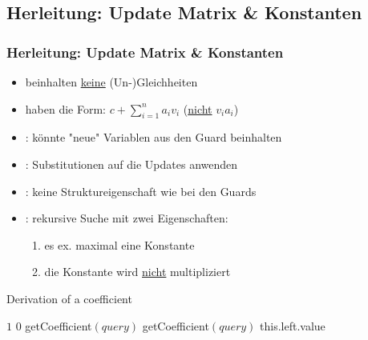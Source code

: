 \subsection{Herleitung: Update Matrix \& Konstanten}
\begin{frame}
	\frametitle{Herleitung: Update Matrix \& Konstanten}
	\begin{itemize}
		\item beinhalten \underline{keine} (Un-)Gleichheiten
		\item haben die Form: $c+\sum_{i=1}^{n}a_i v_i$ (\underline{nicht} $v_i a_i$)
		\item {}: k\"onnte "neue" Variablen aus den Guard beinhalten
		\item[] : Substitutionen auf die Updates anwenden
		\item {}: keine Struktureigenschaft wie bei den Guards
		\item[] : rekursive Suche mit zwei Eigenschaften:
			\begin{enumerate}
				\item es ex. maximal eine Konstante
				\item die Konstante wird \underline{nicht} multipliziert
			\end{enumerate}
	\end{itemize}
\end{frame}

\begin{frame} %
	\begin{algorithm}[H]
		\caption{Derivation of a coefficient}
		\begin{algorithmic}[1]
			\State \Return $1$
			\State \Return $0$
			\EndIf
			\State
			\State \Return getCoefficient$(query)$
			\Else
			\State \Return getCoefficient$(query)$
			\EndIf
			\EndIf
			\State \Return this.left.value
			\EndIf				
			\EndIf
			\EndFunction
		\end{algorithmic}
	\end{algorithm}
\end{frame}


